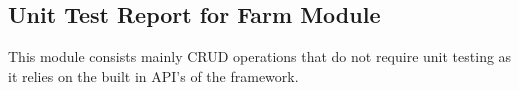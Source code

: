 \documentclass[11pt,fleqn]{book} %
\begin{document}
		\subsection{Unit Test Report for Farm Module}
			This module consists mainly CRUD operations that do not require unit testing as it relies on the built in API's of the framework.
%				
%				
%				
%				
%				
%				
			
\end{document}

